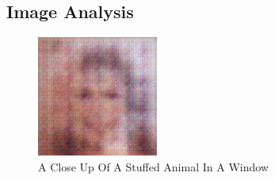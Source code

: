 \documentclass{article}%
\begin{document}
%
\subsection{Image Analysis}%
\label{subsec:ImageAnalysis}%


\begin{figure}[h!]%
\centering%
\includegraphics[width=150px]{500_fake_images/samples_5_410.png}%
\caption{A Close Up Of A Stuffed Animal In A Window}%
\end{figure}

%
\end{document}
